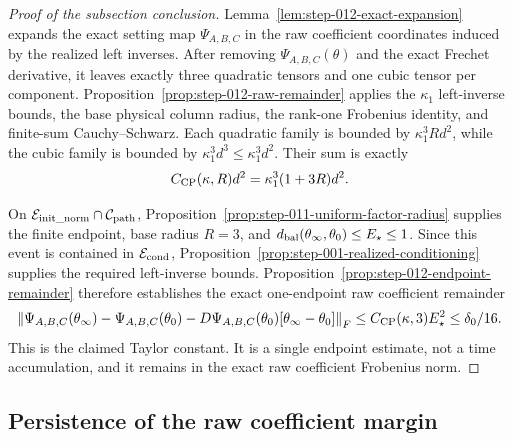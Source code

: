 \begin{proof}[Proof of the subsection conclusion]

Lemma~\ref{lem:step-012-exact-expansion} expands the exact setting map
\(\Psi_{A,B,C}\) in the raw coefficient coordinates induced by the realized
left inverses. After removing \(\Psi_{A,B,C}(\theta)\) and the exact Frechet
derivative, it leaves exactly three quadratic tensors and one cubic tensor
per component. Proposition~\ref{prop:step-012-raw-remainder} applies the
\(\kappa_1\) left-inverse bounds, the base physical column radius,
the rank-one Frobenius identity, and finite-sum Cauchy--Schwarz. Each
quadratic family is bounded by \(\kappa_1^3Rd^2\), while the cubic family is
bounded by \(\kappa_1^3d^3\le\kappa_1^3d^2\). Their sum is exactly
\[
  C_{\rm CP}(\kappa,R)d^2
  =\kappa_1^3(1+3R)d^2.
\]

On \(\mathcal E_{\rm init\_norm}\cap\mathcal C_{\rm path}\),
Proposition~\ref{prop:step-011-uniform-factor-radius} supplies the finite
endpoint, base radius \(R=3\), and
\(d_{\rm bal}(\theta_\infty,\theta_0)\le E_\star\le1\). Since this event is
contained in \(\mathcal E_{\rm cond}\),
Proposition~\ref{prop:step-001-realized-conditioning} supplies the required
left-inverse bounds. Proposition~\ref{prop:step-012-endpoint-remainder}
therefore establishes the exact one-endpoint raw coefficient remainder
\[
  \left\|\Psi_{A,B,C}(\theta_\infty)-\Psi_{A,B,C}(\theta_0)
      -D\Psi_{A,B,C}(\theta_0)[\theta_\infty-\theta_0]\right\|_F
  \le C_{\rm CP}(\kappa,3)E_\star^2
  \le\delta_0/16.
\]
This is the claimed Taylor constant. It is a single endpoint estimate, not a
time accumulation, and it remains in the exact raw coefficient Frobenius
norm.

\end{proof}

\subsection{Persistence of the raw coefficient margin}\label{app:step-013}

